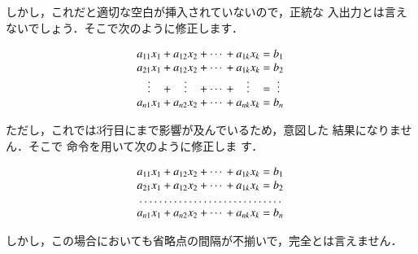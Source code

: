 %
%
しかし，これだと適切な空白が挿入されていないので，正統な
入出力とは言えないでしょう．そこで次のように修正します．

\begin{InOut}
\begin{displaymath}
\begin{array}{*{2}{c@{\:+\:}}%
   @{\cdots\:+\:}c@{\;=\;}c}
 a_{11}x_1 & a_{12}x_2 & a_{1k}x_k
   & b_1\\
 a_{21}x_1 & a_{12}x_2 & a_{1k}x_k
   & b_2\\
 \vdots    & \vdots    & \vdots
   & \vdots\\
 a_{n1}x_1 & a_{n2}x_2 & a_{nk}x_k
   & b_n\\
\end{array}
\end{displaymath}
\end{InOut}
ただし，これでは3行目にまで影響が及んでいるため，意図した
結果になりません．そこで  命令を用いて次のように修正しま
す．
%
\begin{InOut}
\begin{displaymath}
 \begin{array}{*{2}{c@{\:+\:}}%
   @{\cdots\:+\:}c@{\;=\;}c}
 a_{11}x_1 & a_{12}x_2 & a_{1k}x_k
    & b_1\\
 a_{21}x_1 & a_{12}x_2 & a_{1k}x_k
    & b_2\\
 \multicolumn{4}{c}{\dotfill} \\
 a_{n1}x_1 & a_{n2}x_2 & a_{nk}x_k
   & b_n\\
 \end{array}
\end{displaymath}
\end{InOut}
しかし，この場合においても省略点の間隔が不揃いで，完全とは言えません．



